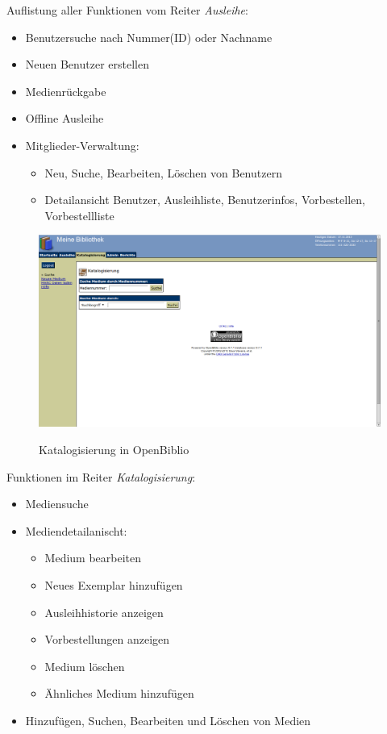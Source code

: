 \documentclass[fontsize=12pt,paper=a4,twoside]{scrartcl}
\begin{document}
Auflistung aller Funktionen vom Reiter \emph{Ausleihe}: 
\begin{itemize}
	\item Benutzersuche nach Nummer(ID) oder Nachname 
	\item Neuen Benutzer erstellen 
	\item Medienrückgabe 
	\item Offline Ausleihe 
	\item Mitglieder-Verwaltung: 
	\begin{itemize}
		\item Neu, Suche, Bearbeiten, Löschen von Benutzern 
		\item Detailansicht Benutzer, Ausleihliste, Benutzerinfos, Vorbestellen, Vorbestellliste 
	\end{itemize}
\end{itemize}
\newpage 
\begin{figure}
	[H] \caption{Katalogisierung in OpenBiblio} 
	\includegraphics[width=1 
	\textwidth]{OpenBiblio/reiter_katalogisierung.png} \label{katalogisierung-openbiblio} 
\end{figure}
Funktionen im Reiter \emph{Katalogisierung}: 
\begin{itemize}
	\item Mediensuche 
	\item Mediendetailanischt: 
	\begin{itemize}
		\item Medium bearbeiten 
		\item Neues Exemplar hinzufügen 
		\item Ausleihhistorie anzeigen 
		\item Vorbestellungen anzeigen 
		\item Medium löschen 
		\item Ähnliches Medium hinzufügen 
	\end{itemize}
	\item Hinzufügen, Suchen, Bearbeiten und Löschen von Medien 
\end{itemize}
\end{document}
